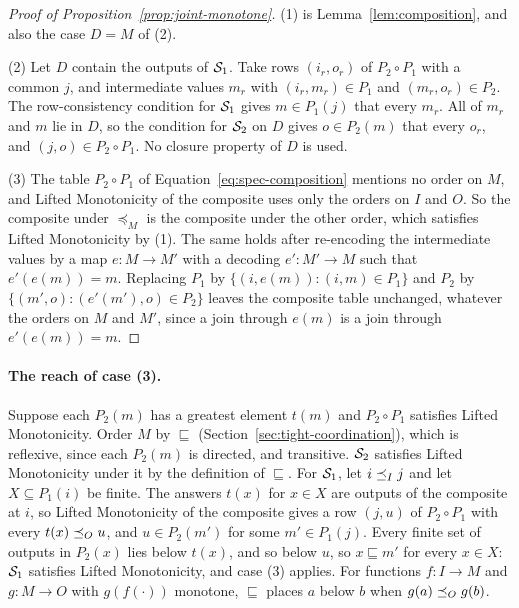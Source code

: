 \begin{proof}[Proof of Proposition~\ref{prop:joint-monotone}]
(1) is Lemma~\ref{lem:composition}, and also the case $D=M$ of (2).

(2) Let $D$ contain the outputs of $\mathcal{S}_1$.  Take rows $(i_r,o_r)$ of $P_2\circ
P_1$ with a common \indesc $j$, and intermediate values $m_r$ with
$(i_r,m_r)\in P_1$ and $(m_r,o_r)\in P_2$.  The row-consistency condition for
$\mathcal{S}_1$ gives $m\in P_1(j)$ that \outrel every $m_r$.  All of $m_r$ and $m$
lie in $D$, so the condition for $\mathcal{S}_2$ on $D$ gives $o\in P_2(m)$ that
\outrel every $o_r$, and $(j,o)\in P_2\circ P_1$.  No closure property of $D$
is used.

(3) The table $P_2\circ P_1$ of Equation~\ref{eq:spec-composition} mentions
no order on $M$, and Lifted Monotonicity of the composite uses only the
orders on $I$ and $O$.  So the composite under $\preceq_M$ is the composite
under the other order, which satisfies Lifted Monotonicity by (1).  The same
holds after re-encoding the intermediate values by a map $e:M\to M'$ with a
decoding $e':M'\to M$ such that $e'(e(m))=m$.  Replacing $P_1$ by
$\{(i,e(m)):(i,m)\in P_1\}$ and $P_2$ by $\{(m',o):(e'(m'),o)\in P_2\}$
leaves the composite table unchanged, whatever the orders on $M$ and $M'$,
since a join through $e(m)$ is a join through $e'(e(m))=m$.
\end{proof}

\paragraph{The reach of case (3).}  Suppose each $P_2(m)$ has a greatest
element $t(m)$ and $P_2\circ P_1$ satisfies Lifted Monotonicity.  Order $M$ by
$\sqsubseteq$ (Section~\ref{sec:tight-coordination}), which is reflexive,
since each $P_2(m)$ is directed, and transitive.  $\mathcal{S}_2$ satisfies Lifted
Monotonicity under it by the definition of $\sqsubseteq$.  For $\mathcal{S}_1$, let
$i\preceq_I j$ and let $X\subseteq P_1(i)$ be finite.  The answers $t(x)$ for
$x\in X$ are outputs of the composite at $i$, so Lifted Monotonicity of the
composite gives a row $(j,u)$ of $P_2\circ P_1$ with every $t(x)\preceq_O u$,
and $u\in P_2(m')$ for some $m'\in P_1(j)$.  Every finite set of outputs in
$P_2(x)$ lies below $t(x)$, and so below $u$, so $x\sqsubseteq m'$ for every
$x\in X$: $\mathcal{S}_1$ satisfies Lifted Monotonicity, and case (3) applies.  For
functions $f:I\to M$ and $g:M\to O$ with $g(f(\cdot))$ monotone, $\sqsubseteq$
places $a$ below $b$ when $g(a)\preceq_O g(b)$.

